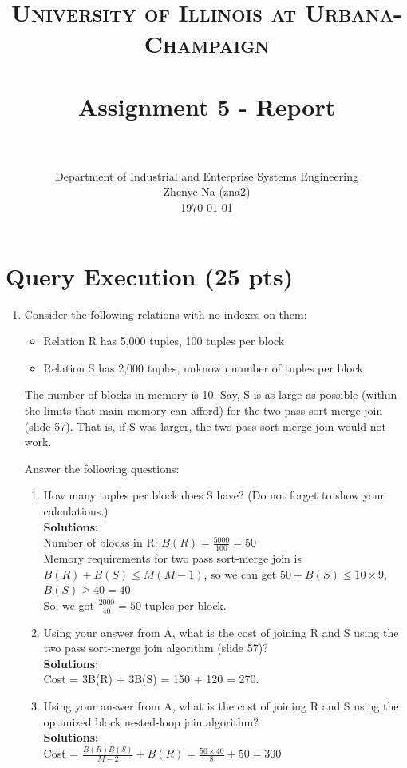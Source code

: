 \documentclass[paper=a4, fontsize=11pt]{scrartcl}
\title{
	\usefont{OT1}{bch}{b}{n}
	\normalfont \normalsize \textsc{University of Illinois at Urbana-Champaign} \\ [25pt]
	\horrule{0.5pt} \\[0.4cm]
	\huge Assignment 5 - Report \\
	\horrule{2pt} \\[0.5cm]
}
\author{
	\normalfont 								\normalsize
	Department of Industrial and Enterprise Systems Engineering\\
	\normalsize Zhenye Na (zna2)\\[-3pt]		\normalsize
	\today
}
\date{}
\numberwithin{equation}{section}		%
\numberwithin{figure}{section}			%
\numberwithin{table}{section}				%
\begin{document}
	\maketitle
	
	\section{Query Execution (25 pts)}
	
	\begin{enumerate}
		\item Consider the following relations with no indexes on them:
		\begin{itemize}
			\item Relation R has 5,000 tuples, 100 tuples per block
			\item Relation S has 2,000 tuples, unknown number of tuples per block 
		\end{itemize}
		
		The number of blocks in memory is 10. Say, S is as large as possible (within the limits that main memory can afford) for the two pass sort-merge join (slide 57). That is, if S was larger, the two pass sort-merge join would not work.
		
		Answer the following questions:
		\begin{enumerate}
			\item How many tuples per block does S have? (Do not forget to show your calculations.)\\
			\textbf{Solutions: }\\
			Number of blocks in R: $B(R) = \frac{5000}{100} = 50$\\
			Memory requirements for two pass sort-merge join is $B(R) + B(S) \leq M(M-1)$, so we can get $50 + B(S) \leq 10 \times 9$, $B(S) \geq 40 = 40$.\\
			So, we got $\frac{2000}{40} = 50$ tuples per block.
			
			\item Using your answer from A, what is the cost of joining R and S using the two pass sort-merge join algorithm (slide 57)?\\
			\textbf{Solutions: }\\
			Cost = 3B(R) + 3B(S) = 150 + 120 = 270.
			
			\item Using your answer from A, what is the cost of joining R and S using the optimized block nested-loop join algorithm?\\
			\textbf{Solutions: }\\
			Cost = $\frac{B(R)B(S)}{M-2} + B(R) = \frac{50 \times 40}{8} + 50 = 300$
			

\end{enumerate}
\end{enumerate}
\end{document}
